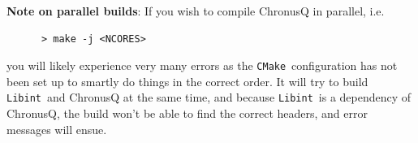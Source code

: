 \documentclass[12pt]{article}
\newcommand{\CMake}{\texttt{CMake}}
\newcommand{\Libint}{\texttt{Libint}}
\begin{document}
    \textbf{Note on parallel builds}: If you wish to compile ChronusQ in parallel,
    i.e.
    \begin{lstlisting}
      > make -j <NCORES>
    \end{lstlisting}

    you will likely experience very many errors as the \CMake~configuration has not
    been set up to smartly do things in the correct order. It will try to build
    \Libint~and ChronusQ at the same time, and because \Libint~is a dependency of
    ChronusQ, the build won't be able to find the correct headers, and error 
    messages will ensue.
\end{document}
